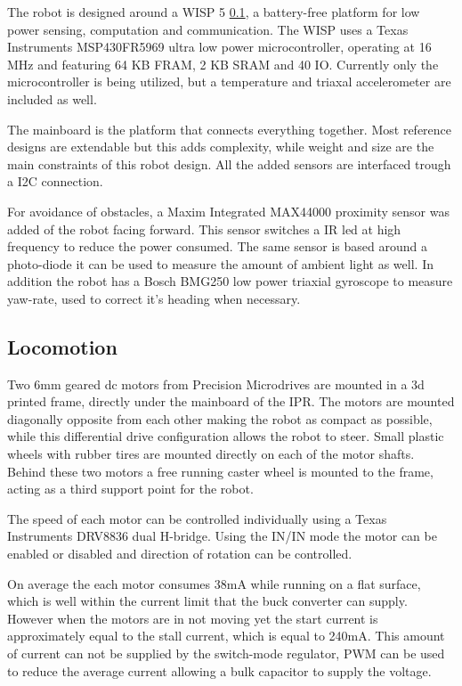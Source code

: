 The robot is designed around a WISP 5 \ref{}, a battery-free platform for low power sensing, computation and communication.
The WISP uses a Texas Instruments MSP430FR5969 ultra low power microcontroller, operating at 16 MHz and featuring 64 KB FRAM, 2 KB SRAM and 40 IO. 
Currently only the microcontroller is being utilized, but a temperature and triaxal accelerometer are included as well. %



The mainboard is the platform that connects everything together.
Most reference designs are extendable but this adds complexity, while weight and size are the main constraints of this robot design.
All the added sensors are interfaced trough a I2C connection.

For avoidance of obstacles, a Maxim Integrated MAX44000 proximity sensor was added of the robot facing forward.
This sensor switches a IR led at high frequency to reduce the power consumed.
The same sensor is based around a photo-diode it can be used to measure the amount of ambient light as well.
In addition the robot has a Bosch BMG250 low power triaxial gyroscope to measure yaw-rate, used to correct it's heading when necessary.

\subsection{Locomotion}

Two 6mm geared dc motors from Precision Microdrives are mounted in a 3d printed frame, directly under the mainboard of the IPR.
The motors are mounted diagonally opposite from each other making the robot as compact as possible, while this differential drive configuration allows the robot to steer.
Small plastic wheels with rubber tires are mounted directly on each of the motor shafts.
Behind these two motors a free running caster wheel is mounted to the frame, acting as a third support point for the robot.

The speed of each motor can be controlled individually using a Texas Instruments DRV8836 dual H-bridge.
Using the IN/IN mode the motor can be enabled or disabled and direction of rotation can be controlled.


% 
On average the each motor consumes 38mA while running on a flat surface, which is well within the current limit that the buck converter can supply.
However when the motors are in not moving yet the start current is approximately equal to the stall current, which is equal to 240mA.
This amount of current can not be supplied by the switch-mode regulator, PWM can be used to reduce the average current allowing a bulk capacitor to supply the voltage.

